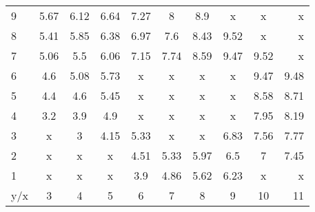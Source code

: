 \begin{tabular}{| l || c | c | c | c | c | c | c | c | r |}
\hline
9   &5.67	&6.12	&6.64	&7.27	&8	    &8.9	&x	    &x	    &x\\
8   &5.41	&5.85	&6.38	&6.97	&7.6	&8.43	&9.52	&x	    &x\\
7   &5.06	&5.5	&6.06	&7.15	&7.74	&8.59	&9.47	&9.52	&x\\
6   &4.6	&5.08	&5.73	&x	    &x	    &x	    &x	    &9.47	&9.48\\
5   &4.4	&4.6	&5.45	&x	    &x	    &x	    &x	    &8.58	&8.71\\
4   &3.2	&3.9	&4.9	&x	    &x	    &x	    &x	    &7.95	&8.19\\
3   &x	    &3	    &4.15	&5.33	&x	    &x	    &6.83	&7.56	&7.77\\
2   &x	    &x	    &x	    &4.51	&5.33	&5.97	&6.5	&7	    &7.45\\
1   &x	    &x	    &x	    &3.9	&4.86	&5.62	&6.23	&x	    &x\\ \hline \hline
y/x &3	    &4	    &5	    &6	    &7	    &8	    &9	    &10	    &11\\ \hline
\end{tabular}